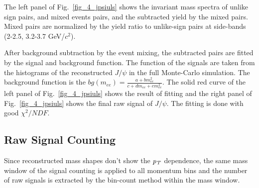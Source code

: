 The left panel of Fig.~\ref{fig_4_jpsiuls} shows the invariant mass spectra of unlike sign pairs, and mixed events pairs, and the subtracted yield by the mixed pairs. 
Mixed pairs are normalized by the yield ratio to unlike-sign pairs at side-bands (2-2.5, 3.2-3.7 GeV/$c^{2}$).

After background subtraction by the event mixing, the subtracted pairs are fitted by the signal and background function. 
The function of the signals are taken from the histograms of the reconstructed $J/\psi$ in the full Monte-Carlo simulation. 
The background function is the $bg(m_{ee}) = \frac{a+bm_{ee}^{2}}{c+dm_{ee}+em_{ee}^{2}}$. 
The solid red curve of the left panel of Fig.~\ref{fig_4_jpsiuls} shows the result of fitting and the right panel of Fig.~\ref{fig_4_jpsiuls} shows the final raw signal of $J/\psi$. 
The fitting is done with good $\chi^{2}/NDF$. 
 
\subsection{Raw Signal Counting}
Since reconstructed mass shapes don't show the $\it{p}_{T}$ dependence, the same mass window of the signal counting is applied to all momentum bins and the number of raw signals is extracted by the bin-count method within the mass window. 

